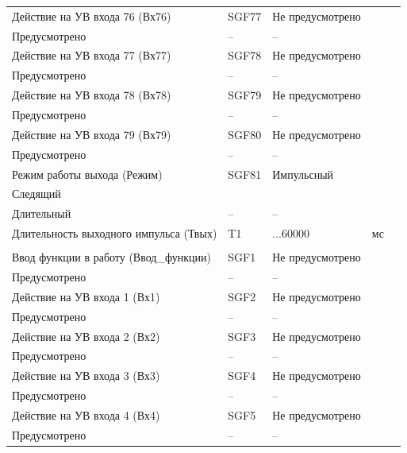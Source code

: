 \begin{longtable}{|>{\centering\arraybackslash}m{5.3cm}|>{\centering\arraybackslash}m{3.3cm}|>{\centering\arraybackslash}m{4.2cm}|>{\centering\arraybackslash}m{1.8cm}|>{\centering\arraybackslash}m{1cm}|}
\hline
\centering Действие на УВ входа 76 (Вх76)  & \centering SGF77 & \centering Не предусмотрено \\ Предусмотрено & \centering -- & \centering \arraybackslash -- \\
\hline
\centering Действие на УВ входа 77 (Вх77)  & \centering SGF78 & \centering Не предусмотрено \\ Предусмотрено & \centering -- & \centering \arraybackslash -- \\
\hline
\centering Действие на УВ входа 78 (Вх78)  & \centering SGF79 & \centering Не предусмотрено \\ Предусмотрено & \centering -- & \centering \arraybackslash -- \\
\hline
\centering Действие на УВ входа 79 (Вх79)  & \centering SGF80 & \centering Не предусмотрено \\ Предусмотрено & \centering -- & \centering \arraybackslash -- \\
\hline
\centering Режим работы выхода (Режим)  & \centering SGF81 & \centering Импульсный \\ Следящий \\ Длительный & \centering -- & \centering \arraybackslash -- \\
\hline
\centering Длительность выходного импульса (Твых)  & \centering T1 & \centering 50...60000 & \centering мс & \centering \arraybackslash 10 \\
\hline
\multicolumn{5}{|c|}{ УВ10 } \\ \hline 
\centering Ввод функции в работу (Ввод\_функции)  & \centering SGF1 & \centering Не предусмотрено \\ Предусмотрено & \centering -- & \centering \arraybackslash -- \\
\hline
\centering Действие на УВ входа 1 (Вх1)  & \centering SGF2 & \centering Не предусмотрено \\ Предусмотрено & \centering -- & \centering \arraybackslash -- \\
\hline
\centering Действие на УВ входа 2 (Вх2)  & \centering SGF3 & \centering Не предусмотрено \\ Предусмотрено & \centering -- & \centering \arraybackslash -- \\
\hline
\centering Действие на УВ входа 3 (Вх3)  & \centering SGF4 & \centering Не предусмотрено \\ Предусмотрено & \centering -- & \centering \arraybackslash -- \\
\hline
\centering Действие на УВ входа 4 (Вх4)  & \centering SGF5 & \centering Не предусмотрено \\ Предусмотрено & \centering -- & \centering \arraybackslash -- \\

\end{longtable}
